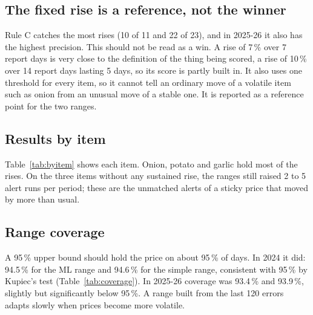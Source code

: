 \begin{table}[H]\centering\small
\caption[Rises caught by the ML range and the simple range]{Sustained rises caught by the ML range and the simple range.}\label{tab:overlap}
\fittab{}
\end{table}

\subsection{The fixed rise is a reference, not the winner}
Rule C catches the most rises (10 of 11 and 22 of 23), and in 2025-26 it also has the highest precision. This should not be read as a win. A rise of 7\,\% over 7 report days is very close to the definition of the thing being scored, a rise of 10\,\% over 14 report days lasting 5 days, so its score is partly built in. It also uses one threshold for every item, so it cannot tell an ordinary move of a volatile item such as onion from an unusual move of a stable one. It is reported as a reference point for the two ranges.

\subsection{Results by item}
Table~\ref{tab:byitem} shows each item. Onion, potato and garlic hold most of the rises. On the three items without any sustained rise, the ranges still raised 2 to 5 alert runs per period; these are the unmatched alerts of a sticky price that moved by more than usual.

\begin{table}[H]\centering\small
\caption[Alerts by item]{Rises caught / rises (alert runs) by item and rule. ``--'': no sustained rise in the period, so the alerts cannot be judged.}\label{tab:byitem}
\fittab{}
\end{table}

\subsection{Range coverage}
A 95\,\% upper bound should hold the price on about 95\,\% of days. In 2024 it did: 94.5\,\% for the ML range and 94.6\,\% for the simple range, consistent with 95\,\% by Kupiec's test (Table~\ref{tab:coverage}). In 2025-26 coverage was 93.4\,\% and 93.9\,\%, slightly but significantly below 95\,\%. A range built from the last 120 errors adapts slowly when prices become more volatile.

